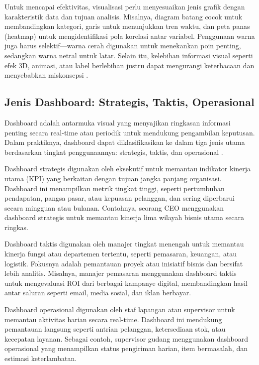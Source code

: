 Untuk mencapai efektivitas, visualisasi perlu menyesuaikan jenis grafik dengan karakteristik data dan tujuan analisis. Misalnya, diagram batang cocok untuk membandingkan kategori, garis untuk menunjukkan tren waktu, dan peta panas (heatmap) untuk mengidentifikasi pola korelasi antar variabel. Penggunaan warna juga harus selektif—warna cerah digunakan untuk menekankan poin penting, sedangkan warna netral untuk latar. Selain itu, kelebihan informasi visual seperti efek 3D, animasi, atau label berlebihan justru dapat mengurangi keterbacaan dan menyebabkan miskonsepsi \cite{few2006dashboard}.

\subsection{Jenis Dashboard: Strategis, Taktis, Operasional}

Dashboard adalah antarmuka visual yang menyajikan ringkasan informasi penting secara real-time atau periodik untuk mendukung pengambilan keputusan. Dalam praktiknya, dashboard dapat diklasifikasikan ke dalam tiga jenis utama berdasarkan tingkat penggunaannya: strategis, taktis, dan operasional \cite{yigitbasioglu2013dashboards}.

Dashboard strategis digunakan oleh eksekutif untuk memantau indikator kinerja utama (KPI) yang berkaitan dengan tujuan jangka panjang organisasi. Dashboard ini menampilkan metrik tingkat tinggi, seperti pertumbuhan pendapatan, pangsa pasar, atau kepuasan pelanggan, dan sering diperbarui secara mingguan atau bulanan. Contohnya, seorang CEO menggunakan dashboard strategis untuk memantau kinerja lima wilayah bisnis utama secara ringkas.

Dashboard taktis digunakan oleh manajer tingkat menengah untuk memantau kinerja fungsi atau departemen tertentu, seperti pemasaran, keuangan, atau logistik. Fokusnya adalah pemantauan proyek atau inisiatif bisnis dan bersifat lebih analitis. Misalnya, manajer pemasaran menggunakan dashboard taktis untuk mengevaluasi ROI dari berbagai kampanye digital, membandingkan hasil antar saluran seperti email, media sosial, dan iklan berbayar.

Dashboard operasional digunakan oleh staf lapangan atau supervisor untuk memantau aktivitas harian secara real-time. Dashboard ini mendukung pemantauan langsung seperti antrian pelanggan, ketersediaan stok, atau kecepatan layanan. Sebagai contoh, supervisor gudang menggunakan dashboard operasional yang menampilkan status pengiriman harian, item bermasalah, dan estimasi keterlambatan.

